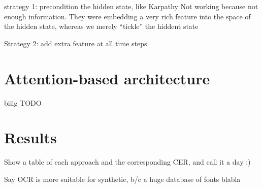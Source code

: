 		strategy 1: precondition the hidden state, like Karpathy
		Not working because not enough information. They were embedding a very rich feature into the space of the hidden state, whereas we merely ``tickle'' the hiddent state

		Strategy 2: add extra feature at all time steps




\section{Attention-based architecture}\label{sec:attention}
	biiig TODO


\section{Results}\label{sec:transcription_results}

		Show a table of each approach and the corresponding CER, and call it a day :)

	Say OCR is more suitable for synthetic, b/c a huge database of fonts blabla

\stopToDo{}

